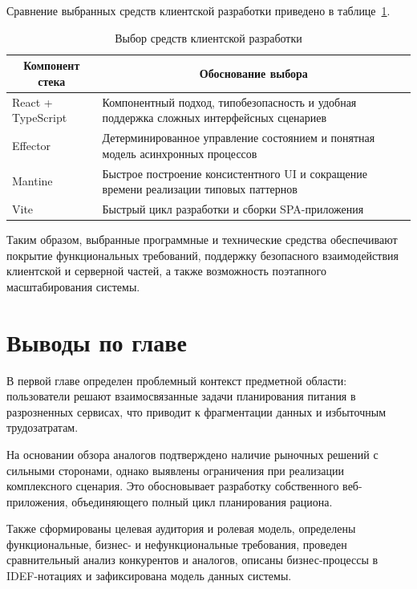 Сравнение выбранных средств клиентской разработки приведено в таблице~\ref{tab:frontend-stack-compare}.

\begin{table}[H]
\caption{Выбор средств клиентской разработки}
\label{tab:frontend-stack-compare}
\begin{tabularx}{\textwidth}{|p{}|X|}
\hline
\multicolumn{1}{|c|}{Компонент стека} & \multicolumn{1}{c|}{Обоснование выбора} \\ \hline
React + TypeScript & Компонентный подход, типобезопасность и удобная поддержка сложных интерфейсных сценариев \\ \hline
Effector & Детерминированное управление состоянием и понятная модель асинхронных процессов \\ \hline
Mantine & Быстрое построение консистентного UI и сокращение времени реализации типовых паттернов \\ \hline
Vite & Быстрый цикл разработки и сборки SPA-приложения \\ \hline
\end{tabularx}
\end{table}

Таким образом, выбранные программные и технические средства обеспечивают покрытие функциональных требований, поддержку безопасного взаимодействия клиентской и серверной частей, а также возможность поэтапного масштабирования системы.

\section{Выводы по главе}

В первой главе определен проблемный контекст предметной области: пользователи решают взаимосвязанные задачи планирования питания в разрозненных сервисах, что приводит к фрагментации данных и избыточным трудозатратам.

На основании обзора аналогов подтверждено наличие рыночных решений с сильными сторонами, однако выявлены ограничения при реализации комплексного сценария. Это обосновывает разработку собственного веб-приложения, объединяющего полный цикл планирования рациона.

Также сформированы целевая аудитория и ролевая модель, определены функциональные, бизнес- и нефункциональные требования, проведен сравнительный анализ конкурентов и аналогов, описаны бизнес-процессы в IDEF-нотациях и зафиксирована модель данных системы.